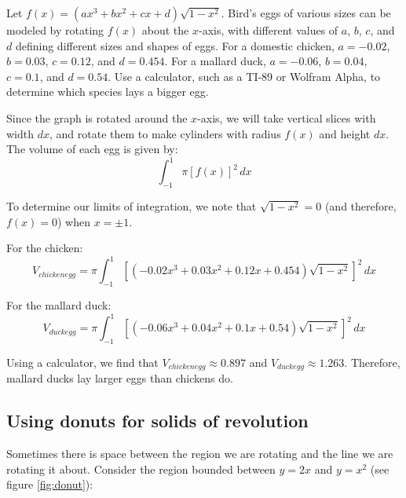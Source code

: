 \begin{Exercise}[label = volume5]
Let $f(x) = (ax^3 + bx^2 + cx + d)\sqrt{1-x^2}$. Bird's eggs of various sizes 
can be modeled by rotating $f(x)$ about the $x$-axis, with different values of 
$a$, $b$, $c$, and $d$ defining different sizes and shapes of eggs. For a 
domestic chicken, $a = -0.02$, $b = 0.03$, $c = 0.12$, and $d = 0.454$. For a 
mallard duck, $a = -0.06$, $b = 0.04$, $c = 0.1$, and $d = 0.54$. Use a 
calculator, such as a TI-89 or Wolfram Alpha, to determine which species lays 
a bigger egg.  
\vspace{50mm}
\end{Exercise}

\begin{Answer}[ref = volume5]
Since the graph is rotated around the $x$-axis, we will take vertical slices 
with width $dx$, and rotate them to make cylinders with radius $f(x)$ and height
$dx$. The volume of each egg is given by:
$$\int_{-1}^1 \pi \left[ f(x) \right]^2\,dx$$

To determine our limits of integration, we note that $\sqrt{1 - x^2} = 0$ (and 
therefore, $f(x) = 0$) when $x = \pm 1$.

For the chicken: 
$$V_{chicken egg} = \pi \int_{-1}^1 \left[ \left(-0.02x^3 + 0.03x^2 + 0.12x + 
0.454 \right) \sqrt{1 - x^2} \right]^2\,dx$$

For the mallard duck:
$$V_{duck egg} = \pi \int_{-1}^1 \left[ \left( -0.06x^3 + 0.04x^2 + 0.1x + 
0.54 \right) \sqrt{1 - x^2} \right]^2\,dx$$

Using a calculator, we find that $V_{chicken egg} \approx 0.897$ and 
$V_{duck egg} \approx 1.263$. Therefore, mallard ducks lay larger eggs than 
chickens do. 
\end{Answer}

\subsection{Using donuts for solids of revolution}
Sometimes there is space between the region we are rotating and the line we are
rotating it about. Consider the region bounded between $y = 2x$ and $y = x^2$  
(see figure \ref{fig:donut}):

